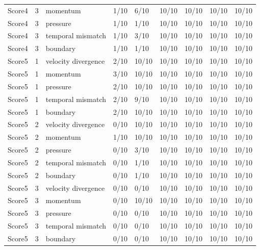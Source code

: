 \begin{longtable}{lllllllll}
Score4 & 3 & momentum & 1/10 & 6/10 & 10/10 & 10/10 & 10/10 & 10/10 \\
Score4 & 3 & pressure & 1/10 & 1/10 & 10/10 & 10/10 & 10/10 & 10/10 \\
Score4 & 3 & temporal mismatch & 1/10 & 3/10 & 10/10 & 10/10 & 10/10 & 10/10 \\
Score4 & 3 & boundary & 1/10 & 1/10 & 10/10 & 10/10 & 10/10 & 10/10 \\
Score5 & 1 & velocity divergence & 2/10 & 10/10 & 10/10 & 10/10 & 10/10 & 10/10 \\
Score5 & 1 & momentum & 3/10 & 10/10 & 10/10 & 10/10 & 10/10 & 10/10 \\
Score5 & 1 & pressure & 2/10 & 10/10 & 10/10 & 10/10 & 10/10 & 10/10 \\
Score5 & 1 & temporal mismatch & 2/10 & 9/10 & 10/10 & 10/10 & 10/10 & 10/10 \\
Score5 & 1 & boundary & 2/10 & 10/10 & 10/10 & 10/10 & 10/10 & 10/10 \\
Score5 & 2 & velocity divergence & 0/10 & 10/10 & 10/10 & 10/10 & 10/10 & 10/10 \\
Score5 & 2 & momentum & 1/10 & 10/10 & 10/10 & 10/10 & 10/10 & 10/10 \\
Score5 & 2 & pressure & 0/10 & 3/10 & 10/10 & 10/10 & 10/10 & 10/10 \\
Score5 & 2 & temporal mismatch & 0/10 & 1/10 & 10/10 & 10/10 & 10/10 & 10/10 \\
Score5 & 2 & boundary & 0/10 & 1/10 & 10/10 & 10/10 & 10/10 & 10/10 \\
Score5 & 3 & velocity divergence & 0/10 & 0/10 & 10/10 & 10/10 & 10/10 & 10/10 \\
Score5 & 3 & momentum & 0/10 & 10/10 & 10/10 & 10/10 & 10/10 & 10/10 \\
Score5 & 3 & pressure & 0/10 & 0/10 & 10/10 & 10/10 & 10/10 & 10/10 \\
Score5 & 3 & temporal mismatch & 0/10 & 0/10 & 10/10 & 10/10 & 10/10 & 10/10 \\
Score5 & 3 & boundary & 0/10 & 0/10 & 10/10 & 10/10 & 10/10 & 10/10 \\
\end{longtable}
